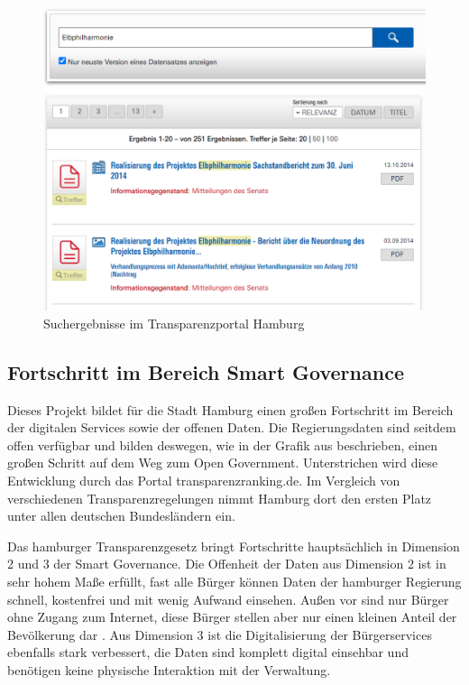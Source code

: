 \begin{figure}
	\includegraphics[width=\textwidth]{graphics/3-transparenzportal}
	\caption[Suchergebnisse im Transparenzportal Hamburg]{Suchergebnisse im Transparenzportal Hamburg}
	\label{fig:3_transparenzportal}
\end{figure}

\subsection{Fortschritt im Bereich Smart Governance}

Dieses Projekt bildet für die Stadt Hamburg einen großen Fortschritt im Bereich der digitalen Services sowie der offenen Daten. Die Regierungsdaten sind seitdem offen verfügbar und bilden deswegen, wie in der Grafik aus \textcite[15]{Fuetterer.2020} beschrieben, einen großen Schritt auf dem Weg zum Open Government. Unterstrichen wird diese Entwicklung durch das Portal transparenzranking.de. Im Vergleich von verschiedenen Transparenzregelungen nimmt Hamburg dort den ersten Platz unter allen deutschen Bundesländern ein.

Das hamburger Transparenzgesetz bringt Fortschritte hauptsächlich in Dimension 2 und 3 der Smart Governance. Die Offenheit der Daten aus Dimension 2 ist in sehr hohem Maße erfüllt, fast alle Bürger können Daten der hamburger Regierung schnell, kostenfrei und mit wenig Aufwand einsehen. Außen vor sind nur Bürger ohne Zugang zum Internet, diese Bürger stellen aber nur einen kleinen Anteil der Bevölkerung dar \autocite[10]{Fuetterer.2020}. Aus Dimension 3 ist die Digitalisierung der Bürgerservices ebenfalls stark verbessert, die Daten sind komplett digital einsehbar und benötigen keine physische Interaktion mit der Verwaltung.